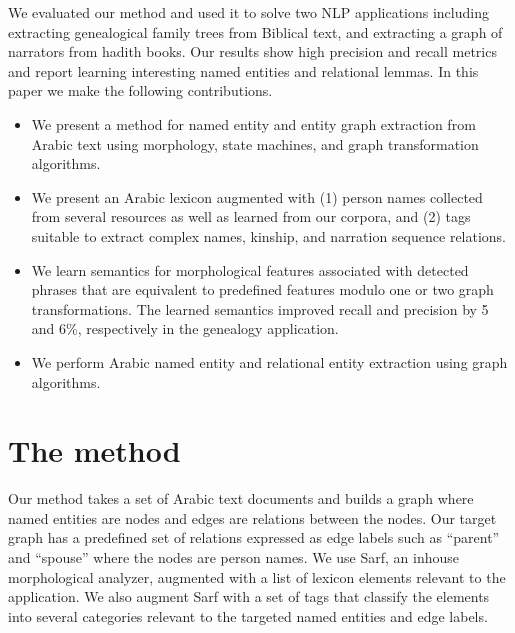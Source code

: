 \documentclass{llncs}
\begin{document}
We evaluated our method and used it to solve two
NLP applications including extracting genealogical family
trees from Biblical text, and extracting a graph of 
narrators from hadith books.%
Our results show high precision and recall metrics and report
learning interesting named entities and relational lemmas.
In this paper we make the following contributions.
\begin{itemize}
\item We present a method for named entity and entity graph
extraction from Arabic text using morphology, state 
machines, and graph transformation algorithms.
\item We present an Arabic lexicon augmented 
with (1) person names collected from several resources as well as
learned from our corpora, and (2) tags suitable to extract complex names,
kinship, and narration sequence relations. 
\item We learn semantics for morphological features associated 
with detected phrases that are equivalent to predefined features
modulo one or two graph transformations. 
The learned semantics improved recall and precision by 
5 and 6\%, respectively in the genealogy application.
\item We perform Arabic named entity and 
relational entity extraction using graph algorithms. 
\end{itemize}

\section{The method}

Our method takes a set of Arabic text documents and builds 
a graph where named entities are nodes and edges are relations 
between the nodes. 
Our target graph has a predefined set of relations expressed 
as edge labels such as ``parent'' and ``spouse'' where the nodes
are person names.
We use Sarf, an inhouse morphological analyzer, augmented with 
a list of lexicon elements relevant to the application.
We also augment Sarf with 
a set of tags that classify the 
elements into several categories 
relevant to the targeted named entities and edge labels. 
\end{document}
